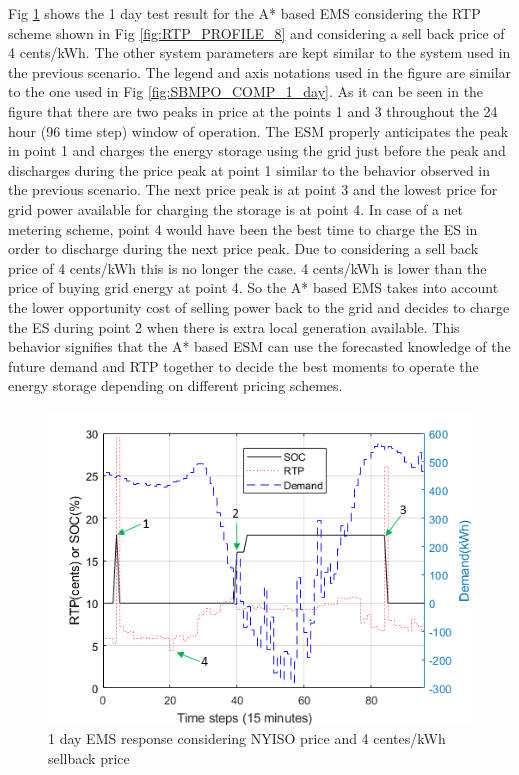 Fig \ref{fig:VAR_1_day_example} shows the 1 day test result for the A* based EMS considering the RTP scheme shown in Fig \ref{fig:RTP_PROFILE_8} and considering a sell back price of 4 cents/kWh. The other system parameters are kept similar to the system used in the previous scenario. The legend and axis notations used in the figure are similar to the one used in Fig \ref{fig:SBMPO_COMP_1_day}. As it can be seen in the figure that there are two peaks in price at the points 1 and 3 throughout the 24 hour (96 time step) window of operation. The ESM properly anticipates the peak in point 1 and charges the energy storage using the grid just before the peak and discharges during the price peak at point 1 similar to the behavior observed in the previous scenario. The next price peak is at point 3 and the lowest price for grid power available for charging the storage is at point 4. In case of a net metering scheme, point 4 would have been the best time to charge the ES in order to discharge during the next price peak. Due to considering a sell back price of 4 cents/kWh this is no longer the case. 4 cents/kWh is lower than the price of buying grid energy at point 4. So the A* based EMS takes into account the lower opportunity cost of selling power back to the grid and decides to charge the ES during point 2 when there is extra local generation available. This behavior signifies that the A* based ESM can use the forecasted knowledge of the future demand and RTP together to decide the best moments to operate the energy storage depending on different pricing schemes.
 \begin{figure}[!ht]
    \centering
    \includegraphics[width = \linewidth]{figs/VAR_1_day_example.png}
    \caption{1 day EMS response considering NYISO price and 4 centes/kWh sellback price}
    \label{fig:VAR_1_day_example}
\end{figure}

